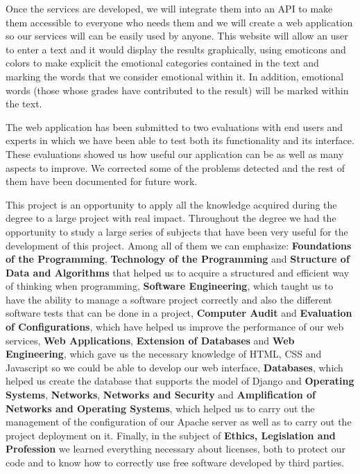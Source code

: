 Once the services are developed, we will integrate them into an API to make them accessible to everyone who needs them and we will create a web application so our services will can be easily used by anyone. This website will allow an user to enter a text and it would display the results graphically, using emoticons and colors to make explicit the emotional categories contained in the text and marking the words that we consider emotional within it. In addition, emotional words (those whose grades have contributed to the result) will be marked within the text.

The web application has been submitted to two evaluations with end users and experts in which we have been able to test both its functionality and its interface. These evaluations showed us how useful our application can be as well as many aspects to improve. We corrected some of the problems detected and the rest of them have been documented for future work.

This project is an opportunity to apply all the knowledge acquired during the degree to a large project with real impact. Throughout the degree we had the opportunity to study a large series of subjects that have been very useful for the development of this project. Among all of them we can emphasize: \textbf{Foundations of the Programming}, \textbf{Technology of the Programming} and \textbf{Structure of Data and Algorithms} that helped us to acquire a structured and efficient way of thinking when programming, \textbf{Software Engineering}, which taught us to have the ability to manage a software project correctly and also the different software tests that can be done in a project, \textbf{Computer Audit} and \textbf{Evaluation of Configurations}, which have helped us improve the performance of our web services, \textbf{Web Applications}, \textbf{Extension of Databases} and \textbf{Web Engineering}, which gave us the necessary knowledge of HTML, CSS and Javascript so we could be able to develop our web interface, \textbf {Databases}, which helped us create the database that supports the model of Django and \textbf{Operating Systems}, \textbf{Networks}, \textbf{Networks and Security} and \textbf{Amplification of Networks and Operating Systems}, which helped us to carry out the management of the configuration of our Apache server as well as to carry out the project deployment on it. Finally, in the subject of \textbf{Ethics, Legislation and Profession} we learned everything necessary about licenses, both to protect our code and to know how to correctly use free software developed by third parties.

